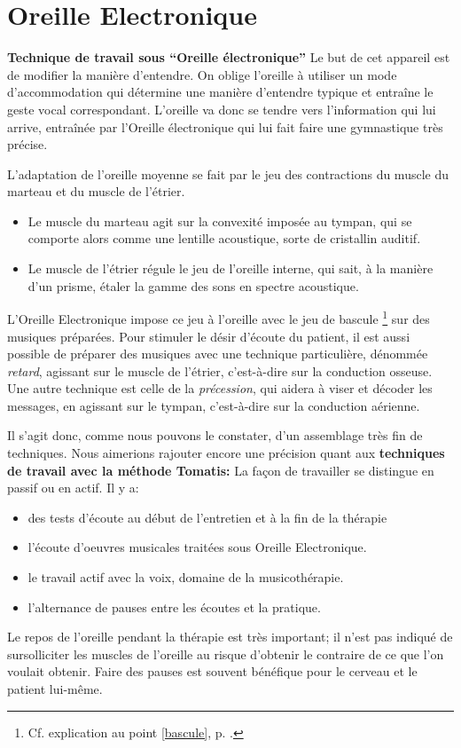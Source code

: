 \section{Oreille Electronique}
\label{oreilleelectronique}


\textbf{Technique de travail sous ``Oreille électronique''}
Le but de cet appareil 
est de modifier la manière d'entendre. On oblige l'oreille à utiliser
un mode d'accommodation qui 
détermine une manière d'entendre typique et entraîne le geste
vocal correspondant.
L'oreille va donc se tendre
vers l'information qui lui arrive, entraînée par l'Oreille
électronique qui lui fait faire une
gymnastique très précise.

 L'adaptation de l'oreille moyenne se fait par le jeu des contractions
du muscle du marteau et du muscle de l'étrier.
\begin{itemize}
\item Le muscle du marteau agit sur la convexité imposée au tympan, qui
se comporte alors comme une lentille acoustique, sorte de cristallin
auditif. 
\item Le muscle de l'étrier régule le jeu de l'oreille interne, qui sait,
à la manière d'un prisme, étaler la gamme des sons en spectre acoustique.
\end{itemize}

L'Oreille Electronique impose ce jeu à l'oreille avec le jeu de
bascule \footnote{Cf. explication au point \ref{bascule}, p. \pageref{bascule}.}  sur des musiques préparées.
Pour stimuler le désir d'écoute
du patient, il est aussi possible de préparer des musiques avec une
technique particulière, dénommée \emph{retard}, agissant sur le muscle de
l'étrier, c'est-à-dire sur la conduction osseuse. Une autre technique
est celle de la \emph{précession}, qui aidera à viser et décoder les messages,
en agissant sur le tympan, c'est-à-dire sur la conduction aérienne.

Il s'agit donc, comme nous pouvons le constater, d'un assemblage très
fin de techniques.
Nous aimerions rajouter encore une précision quant aux \textbf{techniques de travail avec la méthode Tomatis: }
La façon de travailler se distingue en passif ou en actif.
Il y a: 
\begin{itemize}
\item des tests d'écoute au début de l'entretien et à la fin de la thérapie
\item l'écoute d'oeuvres musicales traitées sous Oreille Electronique.
\item le travail actif avec la voix, domaine de la musicothérapie.
\item l'alternance de pauses entre les écoutes et la pratique.
\end{itemize}
Le repos de l'oreille pendant la thérapie est très important; il n'est
pas indiqué de
sursolliciter les muscles de l'oreille au risque d'obtenir le
contraire de ce que l'on voulait obtenir. Faire des pauses est
souvent bénéfique pour le cerveau et le patient lui-même.
